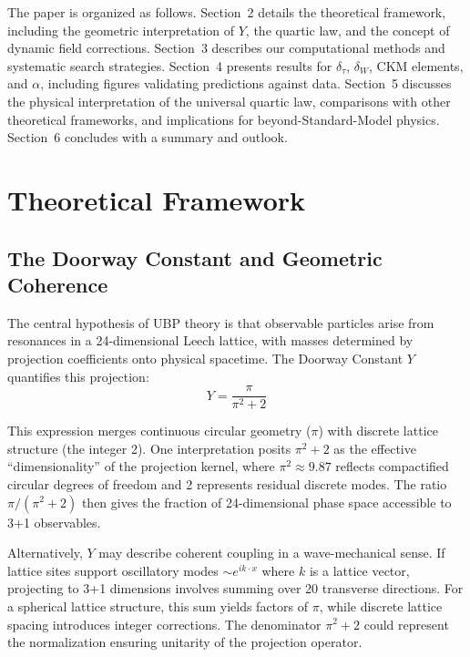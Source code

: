 \documentclass[11pt,a4paper]{article}
\begin{document}
The paper is organized as follows. Section~2 details the theoretical framework, including the geometric interpretation of $Y$, the quartic law, and the concept of dynamic field corrections. Section~3 describes our computational methods and systematic search strategies. Section~4 presents results for $\delta_\tau$, $\delta_W$, CKM elements, and $\alpha$, including figures validating predictions against data. Section~5 discusses the physical interpretation of the universal quartic law, comparisons with other theoretical frameworks, and implications for beyond-Standard-Model physics. Section~6 concludes with a summary and outlook.

\section{Theoretical Framework}

\subsection{The Doorway Constant and Geometric Coherence}

The central hypothesis of UBP theory is that observable particles arise from resonances in a 24-dimensional Leech lattice, with masses determined by projection coefficients onto physical spacetime. The Doorway Constant $Y$ quantifies this projection:
\begin{equation}
Y = \frac{\pi}{\pi^2 + 2}
\end{equation}

This expression merges continuous circular geometry ($\pi$) with discrete lattice structure (the integer 2). One interpretation posits $\pi^2 + 2$ as the effective ``dimensionality'' of the projection kernel, where $\pi^2 \approx 9.87$ reflects compactified circular degrees of freedom and 2 represents residual discrete modes. The ratio $\pi/(\pi^2+2)$ then gives the fraction of 24-dimensional phase space accessible to 3+1 observables.

Alternatively, $Y$ may describe coherent coupling in a wave-mechanical sense. If lattice sites support oscillatory modes $\sim e^{i k \cdot x}$ where $k$ is a lattice vector, projecting to 3+1 dimensions involves summing over 20 transverse directions. For a spherical lattice structure, this sum yields factors of $\pi$, while discrete lattice spacing introduces integer corrections. The denominator $\pi^2 + 2$ could represent the normalization ensuring unitarity of the projection operator.
\end{document}
